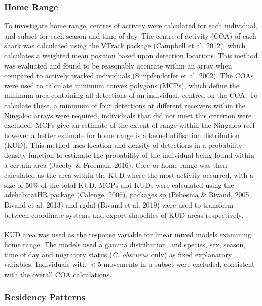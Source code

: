\documentclass[11pt,a4paper]{article}
\begin{document}
	
	\subsubsection{Home Range}
	
	To investigate home range, centres of activity were calculated for each individual, and subset for each season and time of day. The centre of activity (COA) of each shark was calculated using the VTrack package (Campbell et al. 2012), which calculates a weighted mean position based upon detection locations. This method was evaluated and found to be reasonably accurate within an array when compared to actively tracked individuals (Simpfendorfer et al. 2002). The COAs were used to calculate minimum convex polygons (MCPs), which define the minimum area containing all detections of an individual, centred on the COA. To calculate these, a minimum of four detections at different receivers within the Ningaloo arrays were required, individuals that did not meet this criterion were excluded. MCPs give an estimate of the extent of range within the Ningaloo reef however a better estimate for home range is a kernel utilisation distribution (KUD). This method uses location and density of detections in a probability density function to estimate the probability of the individual being found within a certain area (Jacoby \& Freeman, 2016). Core or home range was then calculated as the area within the KUD where the most activity occurred, with a size of 50\% of the total KUD. MCPs and KUDs were calculated using the adehabitatHR package (Calenge, 2006), packages sp (Pebesma \& Bivand, 2005, Bivand et al. 2013) and rgdal (Bivand et al. 2019) were used to transform between coordinate systems and export shapefiles of KUD areas respectively. \\
	\\
	KUD area was used as the response variable for linear mixed models examining home range. The models used a gamma distribution, and species, sex, season, time of day and migratory status (\textit{C. obscurus} only) as fixed explanatory variables. Individuals with $<$5 movements in a subset were excluded, consistent with the overall COA calculations.\\
	
	
	\subsubsection{Residency Patterns}
	
\end{document}

